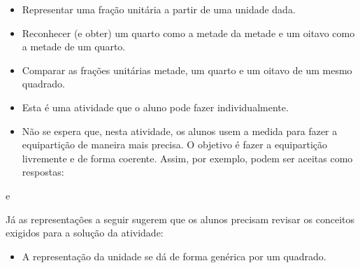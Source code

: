 \begin{multicols}{2}

  \begin{objetivos}{}{}
\begin{itemize} %
    \item       Representar uma fração unitária a partir de uma unidade dada.
    \item       Reconhecer (e obter) um quarto como a metade da metade e um oitavo como a metade de um quarto.
    \item       Comparar as frações unitárias metade, um quarto e um oitavo de um mesmo quadrado.
\end{itemize} %
\end{objetivos}

\begin{orientacoes}
  \begin{itemize} %
    \item       Esta é uma atividade que o aluno pode fazer individualmente.
    \item       Não se espera que, nesta atividade, os alunos usem a medida para fazer a equipartição de maneira mais precisa. O objetivo é fazer a equipartição livremente e de forma coerente. Assim, por exemplo, podem ser aceitas como respostas:
\end{itemize} %
\begin{center}
e
\end{center}
  Já as representações a seguir sugerem que os alunos precisam revisar os conceitos exigidos para a solução da atividade:
\begin{center}
\end{center}
\begin{itemize} %
    \item       A representação da unidade se dá de forma genérica por um quadrado.

\end{itemize}
\end{orientacoes}
\end{multicols}
